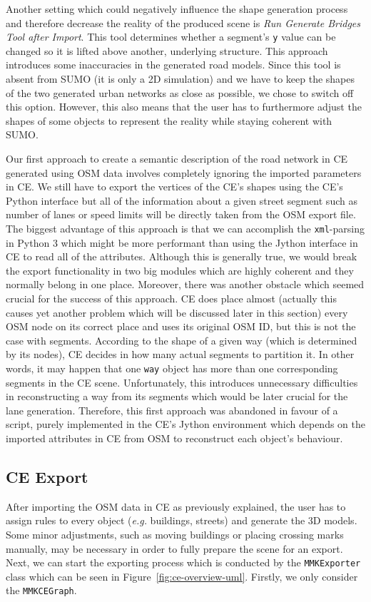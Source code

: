 Another setting which could negatively influence the shape generation process and therefore decrease the reality of the produced scene is \emph{Run Generate Bridges Tool after Import}. This tool determines whether a segment's \texttt{y} value can be changed so it is lifted above another, underlying structure. This approach introduces some inaccuracies in the generated road models. Since this tool is absent from SUMO (it is only a 2D simulation) and we have to keep the shapes of the two generated urban networks as close as possible, we chose to switch off this option. However, this also means that the user has to furthermore adjust the shapes of some objects to represent the reality while staying coherent with SUMO.

Our first approach to create a semantic description of the road network in CE generated using OSM data involves completely ignoring the imported parameters in CE. We still have to export the vertices of the CE's shapes using the CE's Python interface but all of the information about a given street segment such as number of lanes or speed limits will be directly taken from the OSM export file. The biggest advantage of this approach is that we can accomplish the \texttt{xml}-parsing in Python 3 which might be more performant than using the Jython interface in CE to read all of the attributes. Although this is generally true, we would break the export functionality in two big modules which are highly coherent and they normally belong in one place. Moreover, there was another obstacle which seemed crucial for the success of this approach. CE does place almost (actually this causes yet another problem which will be discussed later in this section) every OSM node on its correct place and uses its original OSM ID, but this is not the case with segments. According to the shape of a given way (which is determined by its nodes), CE decides in how many actual segments to partition it. In other words, it may happen that one \texttt{way} object has more than one corresponding segments in the CE scene. Unfortunately, this introduces unnecessary difficulties in reconstructing a way from its segments which would be later crucial for the lane generation. Therefore, this first approach was abandoned in favour of a script, purely implemented in the CE's Jython environment which depends on the imported attributes in CE from OSM to reconstruct each object's behaviour. 

\subsection{CE Export}
After importing the OSM data in CE as previously explained, the user has to assign rules to every object (\emph{e.g.} buildings, streets) and generate the 3D models. Some minor adjustments, such as moving buildings or placing crossing marks manually, may be necessary in order to fully prepare the scene for an export. Next, we can start the exporting process which is conducted by the \texttt{MMKExporter} class which can be seen in Figure~\ref{fig:ce-overview-uml}. Firstly, we only consider the \texttt{MMKCEGraph}. 

